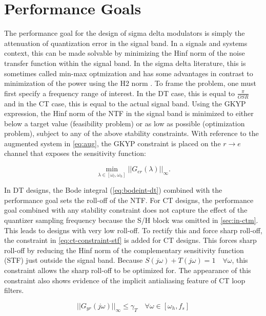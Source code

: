 \section{Performance Goals}
\label{sec:stab-perf}

The performance goal for the design of sigma delta modulators is simply the attenuation of quantization error in the signal band. In a signals and systems context, this can be made solvable by minimizing the \gls{Hinf} norm of the noise transfer function within the signal band. In the sigma delta literature, this is sometimes called min-max optmization and has some advantages in contrast to minimization of the power using the \gls{H2} norm \cite{Nagahara2012}. To frame the problem, one must first specify a frequency range of interest. In the \gls{DT} case, this is equal to $\frac{\pi}{OSR}$ and in the \gls{CT} case, this is equal to the actual signal band. Using the \gls{GKYP} expression, the \gls{Hinf} norm of the \gls{NTF} in the signal band is minimized to either below a target value (feasibility problem) or as low as possible (optimization problem), subject to any of the above stability constraints. With reference to the augmented system in \autoref{eq:aug}, the \gls{GKYP} constraint is placed on the $r \rightarrow e$ channel that exposes the sensitivity function:

\begin{equation}
	\min_{\lambda \in [\omega_l, \omega_h]} ||G_{er}(\lambda)||_\infty \label{eq:perf}.
\end{equation}

In \gls{DT} designs, the Bode integral (\ref{eq:bodeint-dt}) combined with the performance goal sets the roll-off of the \gls{NTF}. For \gls{CT} designs, the performance goal combined with any stability constraint does not capture the effect of the quantizer sampling frequency because the \gls{S/H} block was omitted in \autoref{sec:in-ctm}. This leads to designs with very low roll-off. To rectify this and force sharp roll-off, the constraint in \ref{eq:ct-constraint-stf} is added for \gls{CT} designs. This forces sharp roll-off by reducing the \gls{Hinf} norm of the complementary sensitivity function (\gls{STF}) just outside the signal band. Because $S(j\omega) + T(j\omega) = 1 \quad \forall \omega$, this constraint allows the sharp roll-off to be optimized for. The appearance of this constraint also shows evidence of the implicit antialiasing feature of \gls{CT} loop filters.

\begin{equation}
	||G_{yr}(j\omega)||_\infty \leq \gamma_{T} \quad \forall \omega \in [\omega_h, f_s] \label{eq:ct-constraint-stf}
\end{equation}